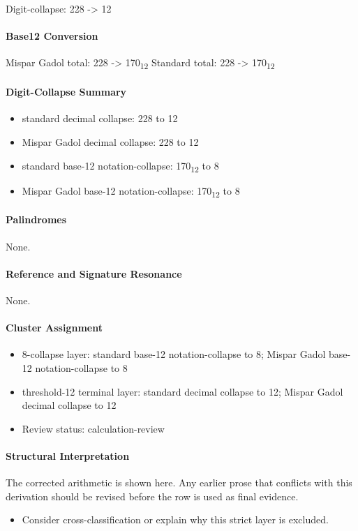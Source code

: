 Digit-collapse: 228 -> 12
\paragraph{Base12 Conversion}
Mispar Gadol total: 228 -> 170\textsubscript{12}
Standard total: 228 -> 170\textsubscript{12}
\paragraph{Digit-Collapse Summary}
\begin{itemize}
\item standard decimal collapse: 228 to 12
\item Mispar Gadol decimal collapse: 228 to 12
\item standard base-12 notation-collapse: 170\textsubscript{12} to 8
\item Mispar Gadol base-12 notation-collapse: 170\textsubscript{12} to 8
\end{itemize}
\paragraph{Palindromes}
None.
\paragraph{Reference and Signature Resonance}
None.
\paragraph{Cluster Assignment}
\begin{itemize}
\item 8-collapse layer: standard base-12 notation-collapse to 8; Mispar Gadol base-12 notation-collapse to 8
\item threshold-12 terminal layer: standard decimal collapse to 12; Mispar Gadol decimal collapse to 12
\item Review status: calculation-review
\end{itemize}
\paragraph{Structural Interpretation}
The corrected arithmetic is shown here. Any earlier prose that conflicts with this derivation should be revised before the row is used as final evidence.

\begin{itemize}
\item Consider cross-classification or explain why this strict layer is excluded.
\end{itemize}

